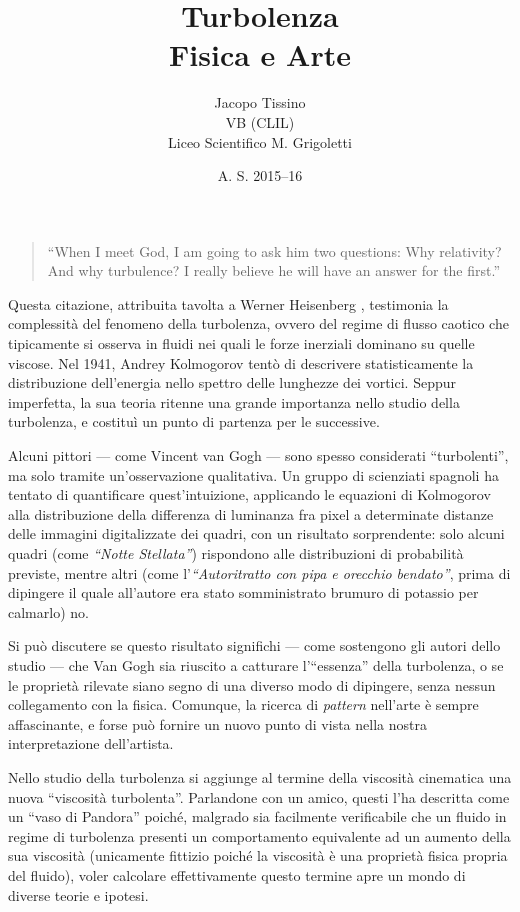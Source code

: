 \documentclass[12pt,a4paper]{article}
\author{Jacopo Tissino \\
VB
(CLIL)\\
Liceo Scientifico M. Grigoletti}
\date{A. S. 2015--16}
\title{\huge{\textbf{Turbolenza}}\\
\Large{Fisica e Arte}}
\numberwithin{equation}{subsection}
\begin{document}
\maketitle

\begin{quote}
``When I meet God, I am going to ask him two questions: Why relativity? And why turbulence? I really believe he will have an answer for the first.''
\end{quote}

Questa citazione, attribuita tavolta a Werner Heisenberg \cite{heisenberg}, testimonia la complessità del fenomeno della turbolenza, ovvero del regime di flusso caotico che tipicamente si osserva in fluidi nei quali le forze inerziali dominano su quelle viscose. 
Nel 1941, Andrey Kolmogorov tentò di descrivere statisticamente la distribuzione dell'energia nello spettro delle lunghezze dei vortici. Seppur imperfetta, la sua teoria ritenne una grande importanza nello studio della turbolenza, e costituì un punto di partenza per le successive.

Alcuni pittori --- come Vincent van Gogh --- sono spesso considerati ``turbolenti'', ma solo tramite un'osservazione qualitativa. Un gruppo di scienziati spagnoli \cite{study2006} ha tentato di quantificare quest'intuizione, applicando le equazioni di Kolmogorov alla distribuzione della differenza di luminanza fra pixel a determinate distanze delle immagini digitalizzate dei quadri, con un risultato sorprendente: solo alcuni quadri (come \emph{``Notte Stellata''}) rispondono alle distribuzioni di probabilità previste, mentre altri (come l'\emph{``Autoritratto con pipa e orecchio bendato''}, prima di dipingere il quale all'autore era stato somministrato brumuro di potassio per calmarlo) no.

Si può discutere se questo risultato significhi --- come sostengono gli autori dello studio --- che Van Gogh sia riuscito a catturare l'``essenza'' della turbolenza, o se le proprietà rilevate siano segno di una diverso modo di dipingere, senza nessun collegamento con la fisica.
Comunque, la ricerca di \emph{pattern} nell'arte è sempre affascinante, e forse può fornire un nuovo punto di vista nella nostra interpretazione dell'artista.

\vspace{7mm}

Nello studio della turbolenza si aggiunge al termine della viscosità cinematica una nuova ``viscosità turbolenta''. Parlandone con un amico, questi l'ha descritta come un ``vaso di Pandora'' poiché, malgrado sia facilmente verificabile che un fluido in regime di turbolenza presenti un comportamento equivalente ad un aumento della sua viscosità (unicamente fittizio poiché la viscosità è una proprietà fisica propria del fluido), voler calcolare effettivamente questo termine apre un mondo di diverse teorie e ipotesi.
\end{document}
